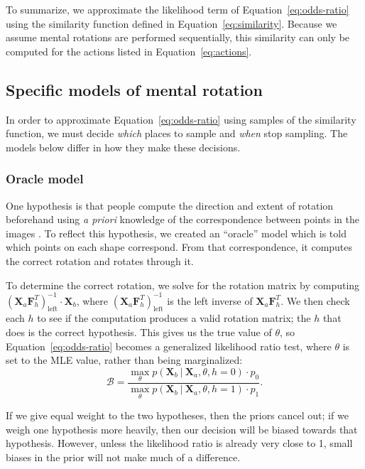 \documentclass[10pt,letterpaper]{article}
\newcommand{\Xa}[0]{\mathbf{X}_a}
\newcommand{\Xb}[0]{\mathbf{X}_b}
\newcommand{\F}[0]{\mathbf{F}}
\newcommand{\hi}[0]{h=0}
\newcommand{\hf}[0]{h=1}
\begin{document}
To summarize, we approximate the likelihood term of
Equation~\ref{eq:odds-ratio} using the similarity function defined in
Equation~\ref{eq:similarity}. Because we assume mental rotations are
performed sequentially, this similarity can only be computed for the
actions listed in Equation~\ref{eq:actions}.

\subsection{Specific models of mental rotation}

In order to approximate Equation~\ref{eq:odds-ratio} using samples of
the similarity function, we must decide \textit{which} places to
sample and \textit{when} stop sampling. The models below differ in how
they make these decisions.

\subsubsection{Oracle model}

One hypothesis is that people compute the direction and extent of
rotation beforehand using \textit{a priori} knowledge of the
correspondence between points in the images
\cite{Funt:1983wn,Just:1985uu}.  To reflect this hypothesis, we
created an ``oracle'' model which is told which points on each shape
correspond. From that correspondence, it computes the correct rotation
and rotates through it.

To determine the correct rotation, we solve for the rotation matrix by
computing $(\Xa \F_h^T)_\mathrm{left}^{-1}\cdot{}\Xb$, where
$(\Xa\F_h^T)_\mathrm{left}^{-1}$ is the left inverse of
$\Xa\F_h^T$. We then check each $h$ to see if the computation produces
a valid rotation matrix; the $h$ that does is the correct
hypothesis. This gives us the true value of $\theta$, so
Equation~\ref{eq:odds-ratio} becomes a generalized likelihood ratio
test, where $\theta$ is set to the MLE value, rather than being
marginalized:
\begin{equation}
  \mathcal{B} = \frac{\max_\theta p(\Xb\ \vert\ \Xa, \theta, \hi)\cdot{}p_0}{\max_\theta p(\Xb\ \vert\ \Xa, \theta, \hf)\cdot{}p_1}.
  \label{eq:mle-lh-ratio}
\end{equation}

If we give equal weight to the two hypotheses, then the priors cancel
out; if we weigh one hypothesis more heavily, then our decision will
be biased towards that hypothesis. However, unless the likelihood
ratio is already very close to 1, small biases in the prior will not
make much of a difference.
\end{document}

